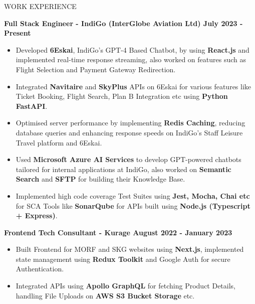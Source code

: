\documentclass{resume} %
\begin{document}







\begin{rSection}{WORK EXPERIENCE}

{\bf Full Stack Engineer - IndiGo (InterGlobe Aviation Ltd)  \hfill July 2023 - Present }
\begin{itemize}
    \item {\normalfont Developed \textbf{6Eskai}, IndiGo's GPT-4 Based Chatbot, by using \textbf{React.js} and implemented real-time response streaming, also worked on features such as Flight Selection and Payment Gateway Redirection.}
    \item{\normalfont Integrated \textbf{Navitaire} and \textbf{SkyPlus} APIs on 6Eskai for various features like Ticket Booking, Flight Search, Plan B Integration etc using \textbf{Python FastAPI}.}
    \item {\normalfont Optimised server performance by implementing \textbf{Redis Caching}, reducing database queries and enhancing response speeds on IndiGo’s Staff Leisure Travel platform and 6Eskai.}
    \item {\normalfont Used \textbf{Microsoft Azure AI Services} to develop GPT-powered chatbots tailored for internal applications at IndiGo, also worked on \textbf{Semantic Search} and \textbf{SFTP} for building their Knowledge Base.}
    \item {\normalfont Implemented high code coverage Test Suites using \textbf{Jest, Mocha, Chai etc} for SCA Tools like \textbf{SonarQube} for APIs built using \textbf{Node.js (Typescript + Express)}.}
\end{itemize}


{\bf Frontend Tech Consultant - Kurage  \hfill August 2022 - January 2023 }
\begin{itemize}

    \item {\normalfont Built Frontend for MORF and SKG websites using \textbf{Next.js}, implemented state management using 
 \textbf{Redux Toolkit} and Google Auth for secure Authentication.}
   \item {\normalfont Integrated APIs using \textbf{{Apollo GraphQL}} for fetching Product Details, handling File Uploads on 
\textbf{AWS S3 Bucket Storage} etc.} 
 
\end{itemize}

\end{rSection}
\end{document}

